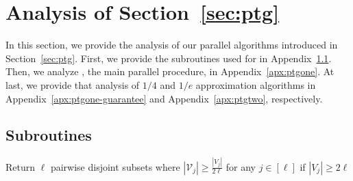 \section{Analysis of Section~\ref{sec:ptg}} %
\label{apx:ptg}
In this section, we provide the analysis of our parallel algorithms
introduced in Section~\ref{sec:ptg}.
First, we provide the subroutines used for \ptgoneshort in Appendix~\ref{apx:subroutine}.
Then, we analyze \ptgoneshort, the main parallel procedure,
in Appendix~\ref{apx:ptgone}.
At last, we provide that analysis of $1/4$ and $1/e$ approximation algorithms
in Appendix~\ref{apx:ptgone-guarantee} and Appendix~\ref{apx:ptgtwo},
respectively.
\subsection{Subroutines}\label{apx:subroutine}
\begin{algorithm}[ht]
\caption{Return $\ell$ pairwise disjoint subsets where $|\mathcal V_j| \ge \frac{|V_j|}{2\ell}$ for any $j \in [\ell]$ if $|V_j|\ge 2\ell$}
\label{alg:dist}
\end{algorithm}


